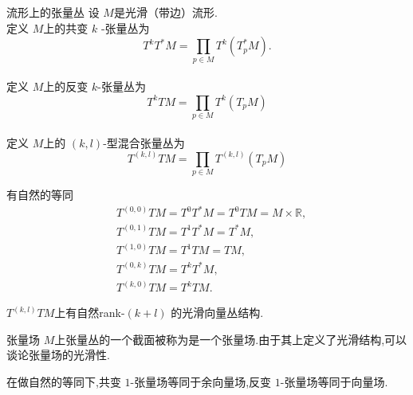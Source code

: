 \documentclass[../../几何与拓扑.tex]{subfiles}
\begin{document}
\begin{definition}{流形上的张量丛}
    设 $ M $是光滑（带边）流形.\\ 
     定义 $ M $上的共变 $ k $   -张量丛为 $$
     T^{k}T^{*}M = \prod_{p \in M} T^{k}\left( T_{p}^{*}M \right).  
     $$\\ 
    定义 $ M $上的反变 $ k $-张量丛为 $$
    T^{k}TM= \prod_{p \in M}T^{k}\left( T_{p}M \right)  
    $$  \\ 
     定义 $ M $上的 $ \left( k,l \right)  $-型混合张量丛为 $$
     T^{\left( k,l \right) }TM= \prod_{p\in M}T^{\left( k,l \right) }\left( T_{p}M \right)  
     $$  
\end{definition}
\begin{remark}
    有自然的等同$$\begin{aligned}&T^{(0,0)}TM=T^0T^*M=T^0TM=M\times\mathbb{R},\\&T^{\left( 0,1 \right) }TM=T^1T^*M=T^*M,\\&T^{\left( 1,0 \right) }TM=T^1TM=TM,\\&T^{(0,k)}TM=T^kT^*M,\\&T^{(k,0)}TM=T^kTM.\end{aligned}$$
\end{remark}

\begin{remark}
    $ T^{\left( k,l \right) }TM $上有自然rank-$ \left( k+ l \right)  $ 的光滑向量丛结构.
\end{remark}

\begin{definition}{张量场}
     $ M $上张量丛的一个截面被称为是一个张量场.由于其上定义了光滑结构,可以谈论张量场的光滑性. 
\end{definition}

\begin{remark}
    在做自然的等同下,共变 $ 1 $-张量场等同于余向量场,反变 $ 1 $-张量场等同于向量场.  
\end{remark}
\end{document}
